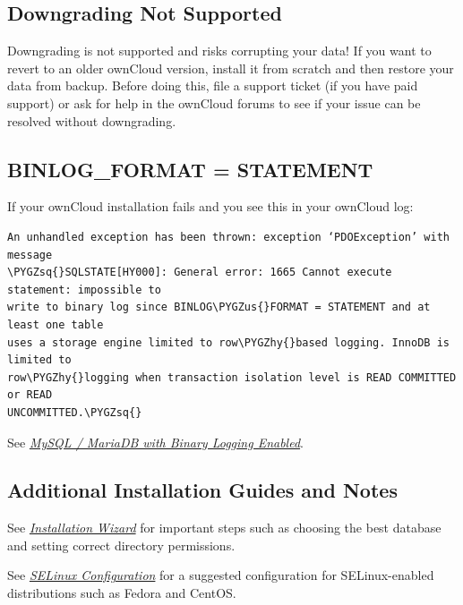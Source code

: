 \documentclass[letterpaper,10pt,english]{sphinxmanual}
\def\PYGZus{\char`\_}
\def\PYGZhy{\char`\-}
\def\PYGZsq{\char`\'}
\renewcommand\PYGZsq{\textquotesingle}
\begin{document}
\subsection{Downgrading Not Supported}
\label{installation/linux_installation:downgrading-not-supported}
Downgrading is not supported and risks corrupting your data! If you want to
revert to an older ownCloud version, install it from scratch and then restore
your data from backup. Before doing this, file a support ticket (if you have
paid support) or ask for help in the ownCloud forums to see if your issue can be
resolved without downgrading.


\subsection{BINLOG\_FORMAT = STATEMENT}
\label{installation/linux_installation:binlog-format-statement}
If your ownCloud installation fails and you see this in your ownCloud log:

\begin{Verbatim}[commandchars=\\\{\}]
An unhandled exception has been thrown: exception ‘PDOException’ with message
\PYGZsq{}SQLSTATE[HY000]: General error: 1665 Cannot execute statement: impossible to
write to binary log since BINLOG\PYGZus{}FORMAT = STATEMENT and at least one table
uses a storage engine limited to row\PYGZhy{}based logging. InnoDB is limited to
row\PYGZhy{}logging when transaction isolation level is READ COMMITTED or READ
UNCOMMITTED.\PYGZsq{}
\end{Verbatim}

See {\hyperref[configuration_database/linux_database_configuration:db\string-binlog\string-label]{\emph{MySQL / MariaDB with Binary Logging Enabled}}}.


\subsection{Additional Installation Guides and Notes}
\label{installation/linux_installation:additional-installation-guides-and-notes}
See {\hyperref[installation/installation_wizard::doc]{\emph{\emph{Installation Wizard}}}} for important steps such as choosing the best
database and setting correct directory permissions.

See {\hyperref[installation/selinux_configuration::doc]{\emph{\emph{SELinux Configuration}}}} for a suggested configuration for
SELinux-enabled distributions such as Fedora and CentOS.
\end{document}
